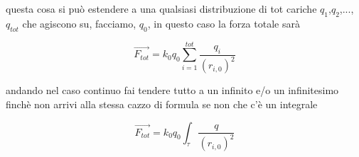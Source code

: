 \documentclass{article}
\begin{document}
questa cosa si può estendere a una qualsiasi distribuzione di tot cariche $q_1$,$q_2$,...,$q_{tot}$ che agiscono su, facciamo, $q_0$, in questo caso la forza totale sarà

\begin{equation*}
  \overrightarrow{F_{tot}} = k_0 q_0 \sum_{i = 1}^{tot} \frac{q_i}{(r_{i,0})^2}
\end{equation*}

andando nel caso continuo fai tendere tutto a un infinito e/o un infinitesimo finchè non arrivi alla stessa cazzo di formula se non che c'è un integrale

\begin{equation*}
  \overrightarrow{F_{tot}} = k_0 q_0 \int_{\tau} \frac{q}{(r_{i,0})^2}
\end{equation*}
\end{document}
